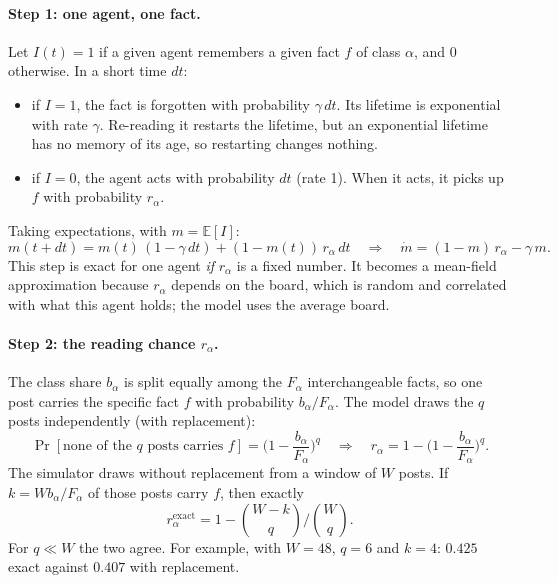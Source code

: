 \documentclass[10pt,a4paper]{article}
\begin{document}
\paragraph{Step 1: one agent, one fact.} Let $I(t)=1$ if a given agent remembers a given fact $f$ of class $\alpha$,
and 0 otherwise. In a short time $dt$:
\begin{itemize}
\item if $I=1$, the fact is forgotten with probability $\gamma\,dt$. Its lifetime is exponential with rate $\gamma$.
  Re-reading it restarts the lifetime, but an exponential lifetime has no memory of its age, so restarting changes
  nothing.
\item if $I=0$, the agent acts with probability $dt$ (rate 1). When it acts, it picks up $f$ with probability $r_\alpha$.
\end{itemize}
Taking expectations, with $m=\mathbb E[I]$:
\begin{equation}
m(t+dt)=m(t)\,(1-\gamma\,dt)+(1-m(t))\,r_\alpha\,dt\quad\Longrightarrow\quad \dot m=(1-m)\,r_\alpha-\gamma\,m .
\end{equation}
This step is exact for one agent \emph{if} $r_\alpha$ is a fixed number. It becomes a mean-field approximation because
$r_\alpha$ depends on the board, which is random and correlated with what this agent holds; the model uses the average
board.

\paragraph{Step 2: the reading chance $r_\alpha$.} The class share $b_\alpha$ is split equally among the $F_\alpha$
interchangeable facts, so one post carries the specific fact $f$ with probability $b_\alpha/F_\alpha$. The model draws
the $q$ posts independently (with replacement):
\begin{equation}
\Pr[\text{none of the $q$ posts carries } f]=\Big(1-\frac{b_\alpha}{F_\alpha}\Big)^q
\quad\Longrightarrow\quad r_\alpha=1-\Big(1-\frac{b_\alpha}{F_\alpha}\Big)^q .\label{eq:r}
\end{equation}
The simulator draws without replacement from a window of $W$ posts. If $k=Wb_\alpha/F_\alpha$ of those posts carry $f$,
then exactly
\begin{equation}
r^{\text{exact}}_\alpha=1-\binom{W-k}{q}\Big/\binom{W}{q}.
\end{equation}
For $q\ll W$ the two agree. For example, with $W=48$, $q=6$ and $k=4$: $0.425$ exact against $0.407$ with replacement.
\end{document}
